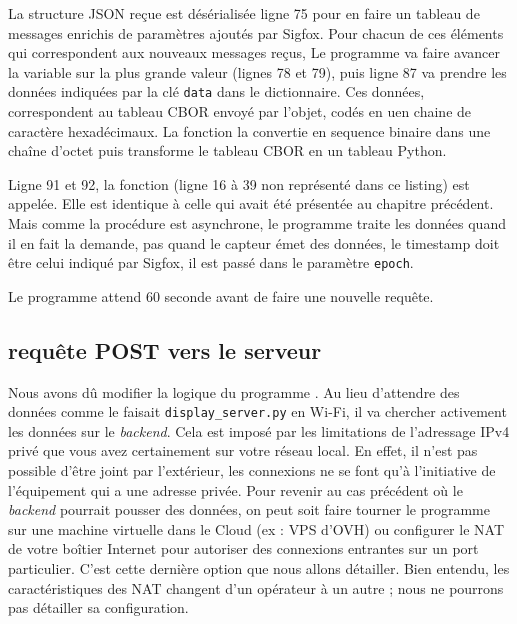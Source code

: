 
La structure JSON reçue est désérialisée ligne 75 pour en faire un tableau de messages enrichis de paramètres ajoutés par Sigfox. Pour chacun de ces éléments qui correspondent aux nouveaux messages reçus, Le programme va faire avancer la variable  sur la plus grande valeur (lignes 78 et 79), puis ligne 87 va prendre les données indiquées par la clé \texttt{data} dans le dictionnaire. Ces données, correspondent au tableau CBOR envoyé par l'objet, codés en uen chaine de caractère hexadécimaux. La fonction  la convertie en sequence binaire dans une chaîne d'octet puis  transforme le tableau CBOR en un tableau Python.

Ligne 91 et 92, la fonction \texttt{} (ligne 16 à 39 non représenté dans ce listing) est appelée. Elle est identique à celle qui avait été présentée au chapitre précédent. Mais comme la procédure est asynchrone, le programme traite les données quand il en fait la demande, pas quand le capteur émet des données, le timestamp doit être celui indiqué par Sigfox, il est passé dans le paramètre \texttt{epoch}.


Le programme attend 60 seconde avant de faire une nouvelle requête.


\subsection{requête POST vers le serveur}\label{chap-sigfox-POST}

\begin{figure}
\end{figure}

Nous avons dû modifier la logique du programme . Au lieu d’attendre des données comme le faisait \texttt{display\_server.py} en Wi-Fi, il va chercher activement les données sur le \textit{backend}. Cela est imposé par les limitations de l’adressage IPv4 privé que vous avez certainement sur votre réseau local. En effet, il n’est pas possible d’être joint par l’extérieur, les connexions ne se font qu'à l’initiative de l’équipement qui a une adresse privée. Pour revenir au cas précédent où le \textit{backend} pourrait pousser des données, on peut soit faire tourner le programme sur une machine virtuelle dans le Cloud (ex : \ac{VPS} d’\acs{OVH}) ou configurer le \ac{NAT} de votre boîtier Internet pour autoriser des connexions entrantes sur un port particulier. C’est cette dernière option que nous allons détailler. Bien entendu, les caractéristiques des \ac{NAT} changent d’un opérateur à un autre ; nous ne pourrons pas détailler sa configuration.


